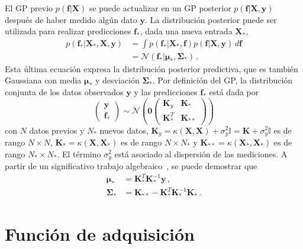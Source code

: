 El GP previo $p(\mathbf{f}|\mathbf{X})$ se puede actualizar en un GP
posterior $p(\mathbf{f}|\mathbf{X},\mathbf{y})$ después de haber medido
algún dato $\mathbf{y}$. La distribución posterior puede ser utilizada 
para realizar predicciones $\mathbf{f}_*$, dada una nueva entrada 
$\mathbf{X}_*$,
\begin{align}
p(\mathbf{f}_*|\mathbf{X}_*,\mathbf{X},\mathbf{y})
&=\int p(\mathbf{f}_*|\mathbf{X}_*,\mathbf{f}) p(\mathbf{f}|\mathbf{X},
\mathbf{y})\,d\mathbf{f} \\
&=\mathcal{N}(\mathbf{f}_*|\boldsymbol\mu_*,\boldsymbol\Sigma_*)\,.
\end{align}
Esta última ecuación expresa la distribución posterior predictiva, que 
es también Gaussiana con media $\boldsymbol\mu_*$ y desviación 
$\boldsymbol\Sigma_*$. Por definición del GP, la distribución conjunta
de los datos observados $\mathbf{y}$ y las predicciones $\mathbf{f}_*$ 
está dada por
\begin{equation}
\left(\begin{array}{c}
\mathbf{y}\\
\mathbf{f}_*
\end{array} 
\right)\sim\mathcal{N}\left(\mathbf{0}
\left(
\begin{array}{cc}
\mathbf{K}_y & \mathbf{K}_* \\
\mathbf{K}_*^T & \mathbf{K}_{**}
\end{array}
\right)
\right)
\end{equation}
con $N$ datos previos y $N_*$ nuevos datos, 
$\mathbf{K}_y=\kappa(\mathbf{X},\mathbf{X})+\sigma_y^2\mathbb{I} = 
\mathbf{K}+\sigma_y^2\mathbb{I}$ es de rango $N\times N$, 
$\mathbf{K}_*=\kappa(\mathbf{X},\mathbf{X}_*)$ es de rango $N\times N_*$
y $\mathbf{K}_{**}=\kappa(\mathbf{X}_*,\mathbf{X}_*)$ es de rango 
$N_*\times N_*$. El término $\sigma_y^2$ está asociado al dispersión de 
las mediciones.
A partir de un significativo trabajo algebraico~\cite{Murphy:12,
Rasmussen:06,deFreitas:13}, se puede demostrar que
\begin{align}
\boldsymbol\mu_*&=\mathbf{K}_*^T\mathbf{K}_*^{-1}\mathbf{y}\,, \\
\boldsymbol\Sigma_*&=\mathbf{K}_{**}-\mathbf{K}_*^T\mathbf{K}_*^{-1}
\mathbf{K}_*\,.
\end{align}

\section*{Función de adquisición}

